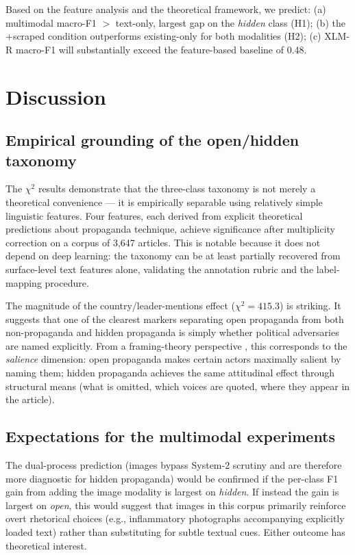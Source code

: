 \documentclass[12pt,a4paper]{article}
\begin{document}
\noindent
Based on the feature analysis and the theoretical framework, we predict:
(a) multimodal macro-F1 $>$ text-only, largest gap on the \emph{hidden} class (H1);
(b) the +scraped condition outperforms existing-only for both modalities (H2);
(c) XLM-R macro-F1 will substantially exceed the feature-based baseline of 0.48.


\section{Discussion}
\label{sec:discuss}

\subsection{Empirical grounding of the open/hidden taxonomy}

The $\chi^2$ results demonstrate that the three-class taxonomy is not merely
a theoretical convenience --- it is empirically separable using relatively
simple linguistic features.
Four features, each derived from explicit theoretical predictions about
propaganda technique, achieve significance after multiplicity correction on
a corpus of 3,647 articles.
This is notable because it does not depend on deep learning: the taxonomy can
be at least partially recovered from surface-level text features alone,
validating the annotation rubric and the label-mapping procedure.

The magnitude of the country/leader-mentions effect ($\chi^2 = 415.3$) is
striking.
It suggests that one of the clearest markers separating open propaganda from
both non-propaganda and hidden propaganda is simply whether political adversaries
are named explicitly.
From a framing-theory perspective \parencite{entman1993framing}, this
corresponds to the \emph{salience} dimension: open propaganda makes certain
actors maximally salient by naming them; hidden propaganda achieves the same
attitudinal effect through structural means (what is omitted, which voices are
quoted, where they appear in the article).

\subsection{Expectations for the multimodal experiments}

The dual-process prediction (images bypass System-2 scrutiny and are therefore
more diagnostic for hidden propaganda) would be confirmed if the per-class
F1 gain from adding the image modality is largest on \emph{hidden}.
If instead the gain is largest on \emph{open}, this would suggest that images
in this corpus primarily reinforce overt rhetorical choices (e.g., inflammatory
photographs accompanying explicitly loaded text) rather than substituting for
subtle textual cues.
Either outcome has theoretical interest.
\end{document}

